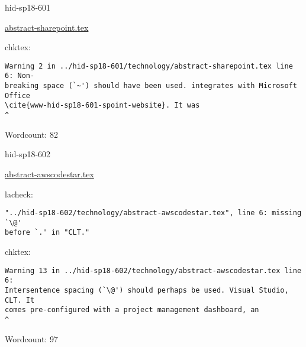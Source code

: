 

\begin{IU}

hid-sp18-601

\href{https://github.com/cloudmesh-community/hid-sp18-601/blob/master//technology/abstract-sharepoint.tex}{abstract-sharepoint.tex}

 
chktex:
\begin{tiny}
\begin{verbatim}
Warning 2 in ../hid-sp18-601/technology/abstract-sharepoint.tex line 6: Non-
breaking space (`~') should have been used. integrates with Microsoft Office
\cite{www-hid-sp18-601-spoint-website}. It was
^
\end{verbatim}
\end{tiny}

Wordcount: 82

\end{IU}



\begin{IU}

hid-sp18-602

\href{https://github.com/cloudmesh-community/hid-sp18-602/blob/master//technology/abstract-awscodestar.tex}{abstract-awscodestar.tex}

 
lacheck:
\begin{tiny}
\begin{verbatim}
"../hid-sp18-602/technology/abstract-awscodestar.tex", line 6: missing `\@'
before `.' in "CLT."
\end{verbatim}
\end{tiny}
chktex:
\begin{tiny}
\begin{verbatim}
Warning 13 in ../hid-sp18-602/technology/abstract-awscodestar.tex line 6:
Intersentence spacing (`\@') should perhaps be used. Visual Studio, CLT. It
comes pre-configured with a project management dashboard, an
^
\end{verbatim}
\end{tiny}

Wordcount: 97

\end{IU}



